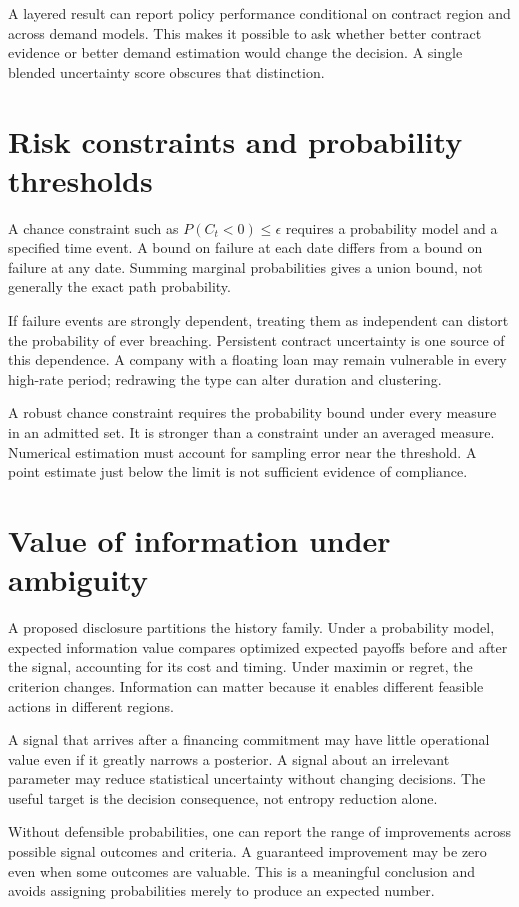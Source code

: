 A layered result can report policy performance conditional on contract region and across demand models. This makes it possible to ask whether better contract evidence or better demand estimation would change the decision. A single blended uncertainty score obscures that distinction.

\section{Risk constraints and probability thresholds}
A chance constraint such as $P(C_t<0)\leq\epsilon$ requires a probability model and a specified time event. A bound on failure at each date differs from a bound on failure at any date. Summing marginal probabilities gives a union bound, not generally the exact path probability.

If failure events are strongly dependent, treating them as independent can distort the probability of ever breaching. Persistent contract uncertainty is one source of this dependence. A company with a floating loan may remain vulnerable in every high-rate period; redrawing the type can alter duration and clustering.

A robust chance constraint requires the probability bound under every measure in an admitted set. It is stronger than a constraint under an averaged measure. Numerical estimation must account for sampling error near the threshold. A point estimate just below the limit is not sufficient evidence of compliance.

\section{Value of information under ambiguity}
A proposed disclosure partitions the history family. Under a probability model, expected information value compares optimized expected payoffs before and after the signal, accounting for its cost and timing. Under maximin or regret, the criterion changes. Information can matter because it enables different feasible actions in different regions.

A signal that arrives after a financing commitment may have little operational value even if it greatly narrows a posterior. A signal about an irrelevant parameter may reduce statistical uncertainty without changing decisions. The useful target is the decision consequence, not entropy reduction alone.

Without defensible probabilities, one can report the range of improvements across possible signal outcomes and criteria. A guaranteed improvement may be zero even when some outcomes are valuable. This is a meaningful conclusion and avoids assigning probabilities merely to produce an expected number.

